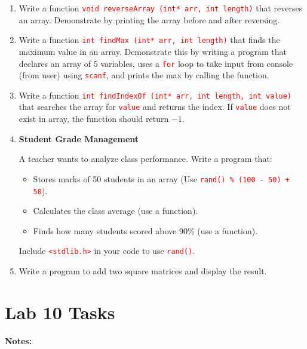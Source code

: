 \documentclass[12pt]{article}
\begin{document}
\begin{enumerate}

\item Write a function \textcolor{red}{\texttt{void reverseArray (int* arr, int length)}} that reverses an array. Demonstrate by printing the array before and after reversing.

\item Write a function \textcolor{red}{\texttt{int findMax (int* arr, int length)}} that finds the maximum value in an array. Demonstrate this by writing a program that declares an array of 
5 variables, uses a \textcolor{red}{\texttt{for}} loop to take input from console (from user) using \textcolor{red}{\texttt{scanf}}, and prints the max by calling the function.

\item Write a function \textcolor{red}{\texttt{int findIndexOf (int* arr, int length, int value)}} that searches the array for \textcolor{red}{\texttt{value}} and returns the index. If 
\textcolor{red}{\texttt{value}} does not exist in array, the function should return $-1$.

\item \textbf{Student Grade Management}

A teacher wants to analyze class performance. Write a program that:

\begin{itemize}
    \item Stores marks of 50 students in an array (Use \textcolor{red}{\texttt{rand() \% (100 - 50) + 50}}).
    \item Calculates the class average (use a function).
    \item Finds how many students scored above 90\% (use a function).
\end{itemize}

Include \textcolor{red}{\texttt{<stdlib.h>}} in your code to use \textcolor{red}{\texttt{rand()}}.

\item Write a program to add two square matrices and display the result. 

\end{enumerate}


\newpage
{}
\section*{Lab 10 Tasks}

\noindent \textbf{Notes:} 
\end{document}
